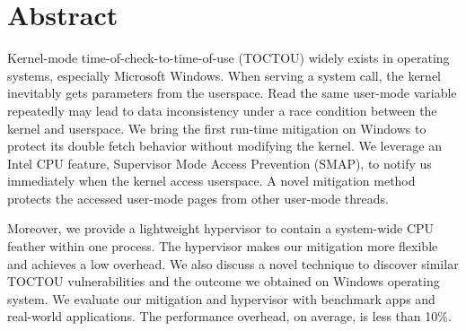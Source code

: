 \section{Abstract}


Kernel-mode time-of-check-to-time-of-use (TOCTOU) widely exists in operating systems, especially Microsoft Windows.  When serving a system call, the kernel inevitably gets parameters from the userspace. Read the same user-mode variable repeatedly may lead to data inconsistency under a race condition between the kernel and userspace. We bring the first run-time mitigation on Windows to protect its double fetch behavior without modifying the kernel. We leverage an Intel CPU feature, Supervisor Mode Access Prevention (SMAP), to notify us immediately when the kernel access userspace. A novel mitigation method protects the accessed user-mode pages from other user-mode threads.

Moreover, we provide a lightweight hypervisor to contain a system-wide CPU feather within one process. The hypervisor makes our mitigation more flexible and achieves a low overhead. We also discuss a novel technique to discover similar TOCTOU vulnerabilities and the outcome we obtained on Windows operating system. We evaluate our mitigation and hypervisor with benchmark apps and real-world applications. The performance overhead, on average, is less than 10\%.
